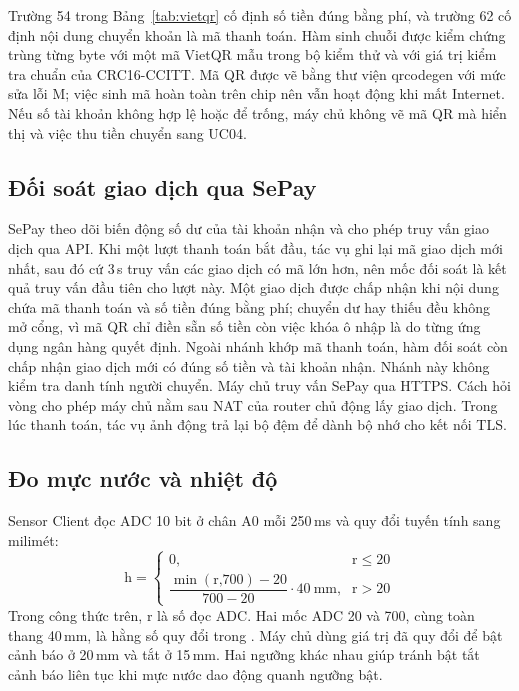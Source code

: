 Trường 54 trong Bảng~\ref{tab:vietqr} cố định số tiền đúng bằng phí, và trường 62 cố định nội
dung chuyển khoản là mã thanh toán. Hàm sinh chuỗi được kiểm chứng trùng từng byte với một mã
VietQR mẫu trong bộ kiểm thử và với giá trị kiểm tra chuẩn  của CRC16-CCITT. Mã QR được
vẽ bằng thư viện qrcodegen với mức sửa lỗi M; việc sinh mã hoàn toàn trên chip nên vẫn hoạt động
khi mất Internet. Nếu số tài khoản không hợp lệ hoặc để trống, máy chủ không vẽ mã QR mà hiển
thị  và việc thu tiền chuyển sang UC04.

\subsection{Đối soát giao dịch qua SePay}\label{sec:f-sepay}
SePay theo dõi biến động số dư của tài khoản nhận và cho phép truy vấn giao dịch qua API. Khi
một lượt thanh toán bắt đầu, tác vụ  ghi lại mã giao dịch mới nhất, sau đó cứ 3\,s
truy vấn các giao dịch có mã lớn hơn, nên mốc đối soát là kết quả truy vấn đầu tiên cho lượt này. Một giao dịch được chấp nhận khi nội dung chứa mã thanh toán và số tiền đúng bằng phí;
chuyển dư hay thiếu đều không mở cổng, vì mã QR chỉ điền sẵn số tiền còn việc khóa ô nhập là do
từng ứng dụng ngân hàng quyết định. Ngoài nhánh khớp mã thanh toán, hàm đối soát còn chấp nhận giao dịch mới có đúng số tiền và tài khoản nhận. Nhánh này không kiểm tra danh tính người chuyển. Máy chủ truy vấn SePay qua HTTPS. Cách hỏi vòng cho phép máy chủ nằm sau NAT của router chủ động lấy giao dịch. Trong lúc thanh toán, tác vụ ảnh động trả lại bộ đệm để dành bộ nhớ cho kết nối TLS.

\subsection{Đo mực nước và nhiệt độ}\label{sec:f-env}
Sensor Client đọc ADC 10 bit ở chân A0 mỗi 250\,ms và quy đổi tuyến tính sang milimét:
\begin{equation}
  \mathrm{h} =
  \begin{cases}
  0\text{,} & \mathrm{r} \le 20 \\[2pt]
  \dfrac{\min(\mathrm{r}\text{,} 700) - 20}{700 - 20} \cdot 40\ \text{mm}\text{,} & \mathrm{r} \mathrel{\text{>}} 20
  \end{cases}
\end{equation}
Trong công thức trên, $\mathrm{r}$ là số đọc ADC. Hai mốc ADC 20 và 700, cùng toàn thang 40\,mm, là hằng số quy đổi trong . Máy chủ dùng giá trị đã quy đổi để bật cảnh báo ở 20\,mm và tắt ở 15\,mm. Hai ngưỡng khác nhau giúp tránh bật tắt cảnh báo liên tục khi mực nước dao động quanh ngưỡng bật.

